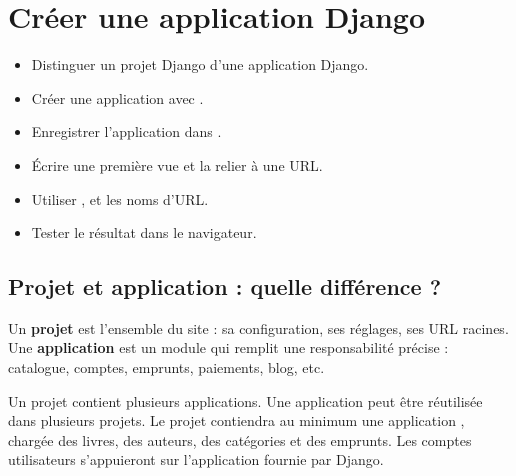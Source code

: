 \chapter{Créer une application Django}
\label{ch:app}


\begin{objectifs}
\begin{itemize}
  \item Distinguer un projet Django d'une application Django.
  \item Créer une application avec .
  \item Enregistrer l'application dans .
  \item Écrire une première vue et la relier à une URL.
  \item Utiliser ,  et les noms d'URL.
  \item Tester le résultat dans le navigateur.
\end{itemize}
\end{objectifs}

\section{Projet et application : quelle différence ?}

Un \textbf{projet} est l'ensemble du site : sa configuration, ses réglages, ses
URL racines. Une \textbf{application} est un module qui remplit une responsabilité
précise : catalogue, comptes, emprunts, paiements, blog, etc.

\begin{retenir}
Un projet contient plusieurs applications. Une application peut être réutilisée
dans plusieurs projets. Le projet \gesibiblio{} contiendra au minimum une
application , chargée des livres, des auteurs, des catégories et
des emprunts. Les comptes utilisateurs s'appuieront sur l'application
 fournie par Django.
\end{retenir}

